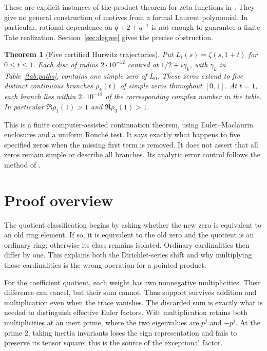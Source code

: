 \documentclass[11pt]{article}
\newtheorem{theorem}{Theorem}[section]
\theoremstyle{definition}\newtheorem{definition}[theorem]{Definition}
\begin{document}
These are explicit instances of the product theorem for zeta functions in \citet[Theorem 2.1, pp.\ 9--10 of the arXiv version]{Ramachandran}. They give no general construction of motives from a formal Laurent polynomial. In particular, rational dependence on $q+2+q^{-1}$ is not enough to guarantee a finite Tate realization. Section~\ref{sec:degree} gives the precise obstruction.

\begin{theorem}[Five certified Hurwitz trajectories]\label{thm:paths-main}
Put $L_t(s)=\zeta(s,1+t)$ for $0\le t\le1$. Each disc of radius $2\cdot10^{-12}$ centred at $1/2+i\gamma_k$, with $\gamma_k$ in Table~\ref{tab:paths}, contains one simple zero of $L_0$. These zeros extend to five distinct continuous branches $\rho_k(t)$ of simple zeros throughout $[0,1]$. At $t=1$, each branch lies within $2\cdot10^{-12}$ of the corresponding complex number in the table. In particular $\Re\rho_1(1)>1$ and $\Re\rho_3(1)>1$.
\end{theorem}

This is a finite computer-assisted continuation theorem, using Euler--Maclaurin enclosures and a uniform Rouch\'e test. It says exactly what happens to five specified zeros when the missing first term is removed. It does not assert that all zeros remain simple or describe all branches. Its analytic error control follows the method of \citet[Theorem 1, pp.\ 3--4]{Johansson}.

\section{Proof overview}
The quotient classification begins by asking whether the new zero is equivalent to an old ring element. If so, it is equivalent to the old zero and the quotient is an ordinary ring; otherwise its class remains isolated. Ordinary cardinalities then differ by one. This explains both the Dirichlet-series shift and why multiplying those cardinalities is the wrong operation for a pointed product.

For the coefficient quotient, each weight has two nonnegative multiplicities. Their difference can cancel, but their sum cannot. Thus support survives addition and multiplication even when the trace vanishes. The discarded sum is exactly what is needed to distinguish effective Euler factors. Witt multiplication retains both multiplicities at an inert prime, where the two eigenvalues are $p^j$ and $-p^j$. At the prime $2$, taking inertia invariants loses the sign representation and fails to preserve its tensor square; this is the source of the exceptional factor.
\end{document}
